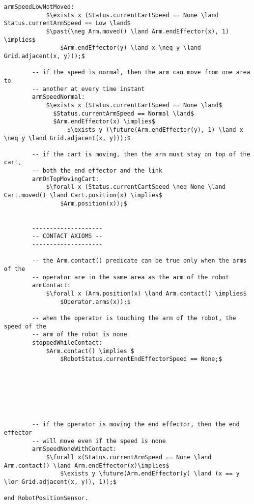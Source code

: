\begin{lstlisting}[fontadjust, mathescape, frame=single]
        armSpeedLowNotMoved: 
            $\exists x (Status.currentCartSpeed == None \land Status.currentArmSpeed == Low \land$ 
            $\past(\neg Arm.moved() \land Arm.endEffector(x), 1) \implies$ 
                $Arm.endEffector(y) \land x \neq y \land Grid.adjacent(x, y)));$

        -- if the speed is normal, then the arm can move from one area to 
        -- another at every time instant
        armSpeedNormal: 
            $\exists x (Status.currentCartSpeed == None \land$
              $Status.currentArmSpeed == Normal \land$
              $Arm.endEffector(x) \implies$
                  $\exists y (\future(Arm.endEffector(y), 1) \land x \neq y \land Grid.adjacent(x, y)));$

        -- if the cart is moving, then the arm must stay on top of the cart,
        -- both the end effector and the link
        armOnTopMovingCart: 
            $\forall x (Status.currentCartSpeed \neq None \land Cart.moved() \land Cart.position(x) \implies$
                $Arm.position(x));$


        --------------------
        -- CONTACT AXIOMS --
        --------------------

        -- the Arm.contact() predicate can be true only when the arms of the 
        -- operator are in the same area as the arm of the robot
        armContact:
            $\forall x (Arm.position(x) \land Arm.contact() \implies$
                $Operator.arms(x));$

        -- when the operator is touching the arm of the robot, the speed of the
        -- arm of the robot is none
        stoppedWhileContact:
            $Arm.contact() \implies $
                $RobotStatus.currentEndEffectorSpeed == None;$






                
        -- if the operator is moving the end effector, then the end effector 
        -- will move even if the speed is none
        armSpeedNoneWithContact: 
            $\forall x(Status.currentArmSpeed == None \land Arm.contact() \land Arm.endEffector(x)\implies$
                $\exists y \future(Arm.endEffector(y) \land (x == y \lor Grid.adjacent(x, y)), 1));$
        
end RobotPositionSensor.
\end{lstlisting}